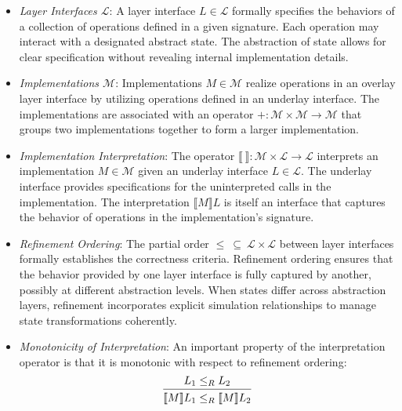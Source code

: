 \begin{itemize}
  \item
    \emph{Layer Interfaces $\mathcal{L}$}:
    A layer interface $L \in \mathcal{L}$
    formally specifies the behaviors
    of a collection of operations defined in a given signature.
    Each operation may interact with a designated abstract state.
    The abstraction of state allows for clear specification
    without revealing internal implementation details.

  \item
    \emph{Implementations $\mathcal{M}$}:
    Implementations $M \in \mathcal{M}$
    realize operations in an overlay layer interface
    by utilizing operations defined in
    an underlay interface.
    The implementations
    are associated with an operator
    $+ : \mathcal{M} \times \mathcal{M} \rightarrow \mathcal{M}$
    that groups two implementations together
    to form a larger implementation.

  \item
    \emph{Implementation Interpretation}:
    The operator $\llbracket\ \rrbracket : \mathcal{M} \times \mathcal{L} \rightarrow \mathcal{L}$
    interprets an implementation $M \in \mathcal{M}$
    given an underlay interface $L \in \mathcal{L}$.
    The underlay interface provides specifications
    for the uninterpreted calls in the implementation.
    The interpretation $\llbracket M \rrbracket L$
    is itself an interface
    that captures the behavior
    of operations in the implementation's signature.

  \item
    \emph{Refinement Ordering}:
    The partial order $\le \:\subseteq\: \mathcal{L} \times \mathcal{L}$
    between layer interfaces
    formally establishes the correctness criteria.
    Refinement ordering ensures that
    the behavior provided by one layer interface
    is fully captured by another,
    possibly at different abstraction levels.
    When states differ across abstraction layers,
    refinement incorporates explicit simulation relationships
    to manage state transformations coherently.

  \item
    \emph{Monotonicity of Interpretation}:
    An important property of the interpretation operator
    is that it is monotonic with respect to refinement ordering:
    \[
      \begin{prooftree}
        \hypo{L_1 \le_R L_2}
        \infer1{\llbracket M \rrbracket L_1 \le_R \llbracket M \rrbracket L_2}
      \end{prooftree}
    \]

\end{itemize}

